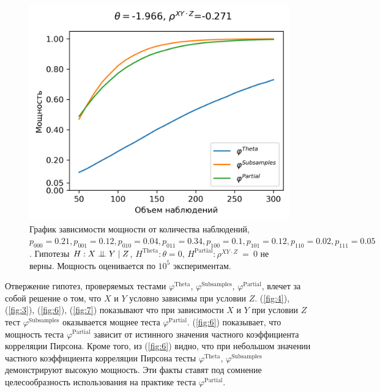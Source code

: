 \begin{figure}[H]
    \centering
    \includegraphics[scale=0.65]{images/graph7.png}
    \caption{График зависимости мощности от количества наблюдений,
    $p_{000}=0.21, p_{001}=0.12, 
    p_{010}=0.04, p_{011}=0.34,
    p_{100}=0.1, p_{101}=0.12, p_{110}=0.02, p_{111}=0.05$. 
    Гипотезы $H: X \perp\!\!\!\perp Y \mid Z$,
    $H^{\text{Theta}}: \theta=0$, 
    $H^{\text{Partial}}: \rho^{XY\cdot Z}~=~0$
    не верны.
    Мощность оценивается по $10^5$ экспериментам.} \label{fig:7}
\end{figure}

Отвержение гипотез, проверяемых  тестами 
$\varphi^{\text{Theta}}$,
$\varphi^{\text{Subsamples}}$,
$\varphi^{\text{Partial}}$, влечет за собой решение о том, что
$X$ и $Y$ условно зависимы при условии $Z$.
(\autoref{fig:4}), 
(\autoref{fig:3}), (\autoref{fig:6}), (\autoref{fig:7})
показывают что при зависимости 
$X$ и $Y$ при условии $Z$ тест $\varphi^{\text{Subsamples}}$
оказывается мощнее теста $\varphi^{\text{Partial}}$.
(\autoref{fig:6}) показывает, что
мощность теста $\varphi^{\text{Partial}}$ зависит от истинного
значения частного коэффициента корреляции Пирсона. Кроме того, из (\autoref{fig:6})
видно, что при небольшом значении частного коэффициента корреляции
Пирсона тесты $\varphi^{\text{Theta}}$,
$\varphi^{\text{Subsamples}}$ демонстрируют высокую мощность.
Эти факты ставят под сомнение целесообразность использования 
на практике теста $\varphi^{\text{Partial}}$.

